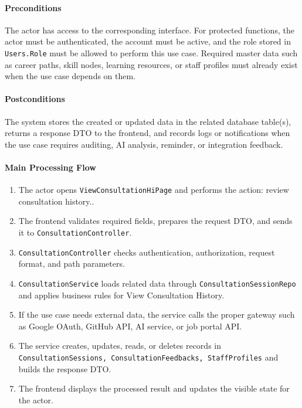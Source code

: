 \paragraph{Preconditions}

The actor has access to the corresponding interface. For protected functions, the actor must be authenticated, the account must be active, and the role stored in \texttt{Users.Role} must be allowed to perform this use case. Required master data such as career paths, skill nodes, learning resources, or staff profiles must already exist when the use case depends on them.

\paragraph{Postconditions}

The system stores the created or updated data in the related database table(s), returns a response DTO to the frontend, and records logs or notifications when the use case requires auditing, AI analysis, reminder, or integration feedback.

\paragraph{Main Processing Flow}

\begin{enumerate}
    \item The actor opens \texttt{ViewConsultationHiPage} and performs the action: review consultation history..
    \item The frontend validates required fields, prepares the request DTO, and sends it to \texttt{ConsultationController}.
    \item \texttt{ConsultationController} checks authentication, authorization, request format, and path parameters.
    \item \texttt{ConsultationService} loads related data through \texttt{ConsultationSessionRepo} and applies business rules for View Consultation History.
    \item If the use case needs external data, the service calls the proper gateway such as Google OAuth, GitHub API, AI service, or job portal API.
    \item The service creates, updates, reads, or deletes records in \texttt{ConsultationSessions, ConsultationFeedbacks, StaffProfiles} and builds the response DTO.
    \item The frontend displays the processed result and updates the visible state for the actor.
\end{enumerate}

